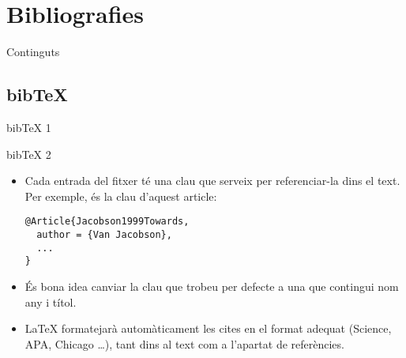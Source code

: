 \section{Bibliografies}

\begin{frame}{Continguts}
\begin{multicols}{2}
\tableofcontents[currentsection]
\end{multicols}
\end{frame}

\subsection{bib\TeX}
\begin{frame}[fragile]{bib\TeX{} 1}
\end{frame}

\begin{frame}[fragile]{bib\TeX{} 2}
\begin{itemize}
\item Cada entrada del fitxer  té una clau que serveix per referenciar-la dins el text.
Per exemple,  és la clau d'aquest article:
\begin{verbatim}
@Article{Jacobson1999Towards,
  author = {Van Jacobson},
  ...
}
\end{verbatim}
\item És bona idea canviar la clau que trobeu per defecte a una que contingui nom any i títol.
\item \LaTeX{} formatejarà automàticament les cites en el format adequat (Science, APA, Chicago \dots), tant dins al text com a l'apartat de referències.
\end{itemize}
\end{frame}

